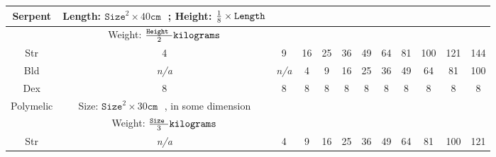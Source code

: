 \documentclass[twoside]{book}
\begin{document}
\begin{table}[htb]
\begin{center}
\begin{tabular}{|c|c|c|c|c|c|c|c|c|c|c|c|}
 Serpent &  Length: \begin{math}  
                        {\texttt{Size}}^{ 2 }   \times   40 \texttt{cm
                          }  \end{math} ; Height: \begin{math} 
                           {{ 1 }\over{ 8 }}  
                           \times  \texttt{Length}  \end{math}
                  \\

\hline

& Weight: \begin{math}  {{\texttt{Height
                    }}\over{ 2 }}  \texttt{kilograms} 
                     \end{math}
                  \\

\hline

 Str & 4 & 9 & 16 & 25 & 36 & 49 & 64 & 81 & 100 & 121 & 144 \\

\hline

 Bld &
                    \textit{n/a}
                  &
                    \textit{n/a}
                  & 4 & 9 & 16 & 25 & 36 & 49 & 64 & 81 & 100 \\

\hline

 Dex & 8 & 8 & 8 & 8 & 8 & 8 & 8 & 8 & 8 & 8 & 8 \\

\hline

 Polymelic &  Size: \begin{math}  
                        {\texttt{Size}}^{ 2 }   \times   30 \texttt{cm
                         }  \end{math} , in some dimension
                  \\

\hline

& Weight: \begin{math}  {{\texttt{Size
                    }}\over{ 3 }}  \texttt{kilograms} 
                     \end{math}
                  \\

\hline

 Str &
                    \textit{n/a}
                  & 4 & 9 & 16 & 25 & 36 & 49 & 64 & 81 & 100 & 121 \\

\hline


\end{tabular}
\end{center}
\end{table}
\end{document}

